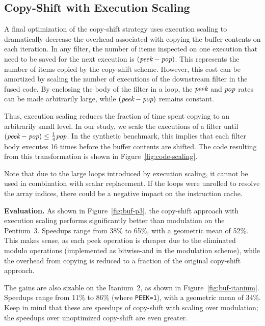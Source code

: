 \subsection{Copy-Shift with Execution Scaling}

A final optimization of the copy-shift strategy uses execution scaling
to dramatically decrease the overhead associated with copying the
buffer contents on each iteration.  In any filter, the number of items
inspected on one execution that need to be saved for the next
execution is $(\mbox{\it peek} - \mbox{\it pop})$.  This represents
the number of items copied by the copy-shift scheme.  However, this
cost can be amortized by scaling the number of executions of the
downstream filter in the fused code.  By enclosing the body of the
filter in a loop, the $\mbox{\it peek}$ and $\mbox{\it pop}$ rates can
be made arbitrarily large, while $(\mbox{\it peek} - \mbox{\it pop})$
remains constant.

Thus, execution scaling reduces the fraction of time spent copying to
an arbitrarily small level.  In our study, we scale the executions of
a filter until $(\mbox{\it peek} - \mbox{\it pop}) \leq \frac{1}{4}
\mbox{\it pop}$.  In the synthetic benchmark, this implies that each
filter body executes 16 times before the buffer contents are shifted.
The code resulting from this transformation is shown in
Figure~\ref{fig:code-scaling}.

Note that due to the large loops introduced by execution scaling, it
cannot be used in combination with scalar replacement.  If the loops
were unrolled to resolve the array indices, there could be a negative
impact on the instruction cache.

{\bf Evaluation.}  As shown in Figure~\ref{fig:buf-p3}, the copy-shift
approach with execution scaling performs significantly better than
modulation on the Pentium~3.  Speedups range from 38\% to 65\%, with a
geometric mean of 52\%.  This makes sense, as each peek operation is
cheaper due to the eliminated modulo operations (implemented as
bitwise-and in the modulation scheme), while the overhead from copying
is reduced to a fraction of the original copy-shift approach.  

The gains are also sizable on the Itanium~2, as shown in
Figure~\ref{fig:buf-itanium}.  Speedups range from 11\% to 86\% (where
{\tt PEEK=1}), with a geometric mean of 34\%.  Keep in mind that these
are speedups of copy-shift with scaling over modulation; the speedups
over unoptimized copy-shift are even greater.

